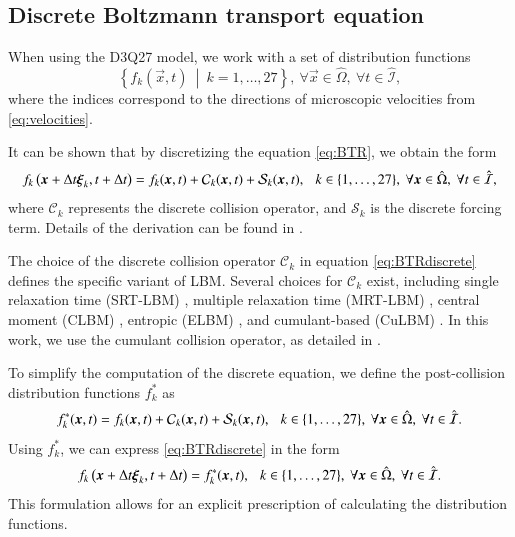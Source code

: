 \subsection{Discrete Boltzmann transport equation}
When using the D3Q27 model, we work with a set of distribution functions
\begin{equation}\label{eq:ddfs}
	\left\{ f_k (\vec{x}, t) \ \middle| \ k = 1, \dots, 27 \right\}, \ \forall \vec{x} \in \hat{\Omega}, \ \forall t \in \hat{\mathcal{I}},
\end{equation}
where the indices correspond to the directions of microscopic velocities from \eqref{eq:velocities}.

It can be shown that by discretizing the equation \eqref{eq:BTR}, we obtain the form
\begin{equation}\label{eq:BTRdiscrete}
	f_{k}\left(\vec{x}+\Delta t \vec{\xi}_{k}, t+\Delta t \right) =
	f_{k}(\vec{x}, t) + \mathcal{C}_{k}(\vec{x}, t) + \mathcal{S}_{k}(\vec{x}, t), \hspace{2.5mm} k \in \{1, \dots, 27 \}, \ \forall \vec{x} \in \hat{\Omega}, \ \forall t \in \hat{\mathcal{I}},
\end{equation}
where $ \mathcal{C}_{k} $ represents the discrete collision operator, and $ \mathcal{S}_{k} $ is the discrete forcing term. Details of the derivation can be found in \cite{Kruger}.

The choice of the discrete collision operator $\mathcal{C}_{k}$ in equation \eqref{eq:BTRdiscrete} defines the specific variant of LBM. Several choices for $\mathcal{C}_{k}$ exist, including single relaxation time (SRT-LBM) \cite{GeierCuLBM}, multiple relaxation time (MRT-LBM) \cite{MRT}, central moment (CLBM) \cite{GeierCLBM}, entropic (ELBM) \cite{ELBM}, and cumulant-based (CuLBM) \cite{GeierCuLBM}. In this work, we use the cumulant collision operator, as detailed in \cite{GeierCuLBM}.

To simplify the computation of the discrete equation, we define the post-collision distribution functions $ f^{*}_{k} $ as
\begin{equation}\label{eq:fstar}
	f^{*}_{k}(\vec{x}, t) = f_{k}(\vec{x}, t) + \mathcal{C}_{k}(\vec{x}, t) + \mathcal{S}_{k}(\vec{x}, t), \hspace{2.5mm} k \in \{1, \dots, 27 \}, \ \forall \vec{x} \in \hat{\Omega}, \ \forall t \in \hat{\mathcal{I}}.
\end{equation}
Using $ f^{*}_{k} $, we can express \eqref{eq:BTRdiscrete} in the form
\begin{equation}\label{eq:collision}
	f_{k}\left(\vec{x}+\Delta t \vec{\xi}_{k}, t+\Delta t\right) = f^{*}_{k}(\vec{x}, t), \hspace{2.5mm} k \in \{1, \dots, 27 \}, \ \forall \vec{x} \in \hat{\Omega}, \ \forall t \in \hat{\mathcal{I}}.
\end{equation}
This formulation allows for an explicit prescription of calculating the distribution functions.